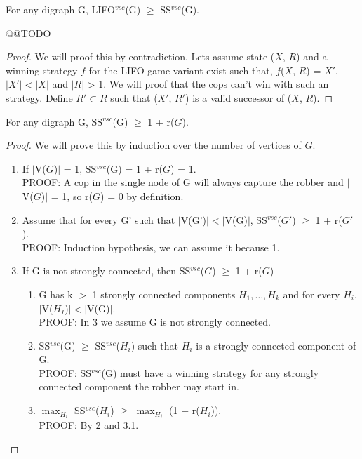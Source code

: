 \begin{lemma}
For any digraph G, LIFO$^{vsc}$(G) $\geq$ SS$^{vsc}$(G).
\end{lemma}
@@TODO
\begin{proof}
We will proof this by contradiction. Lets assume state ($X$, $R$) and a winning strategy $f$ for the LIFO game variant exist such that, $f$($X$, $R$) = $X'$, $|X'| < |X|$ and $|R|$ > 1. We will proof that the cops can't win with such an strategy. Define $R' \subset R$ such that ($X'$, $R'$) is a valid successor of ($X$, $R$).
\end{proof}
\begin{lemma}
For any digraph G, SS$^{vsc}$(G) $\geq$ 1 + r($G$).
\end{lemma}
\begin{proof}
We will prove this by induction over the number of vertices of $G$.
\begin{enumerate}
  \item If $|$V($G$)$|$ = 1, SS$^{vsc}$(G) = 1 + r($G$) = 1. \\
  PROOF: A cop in the single node of G will always capture the robber and $|$V($G$)$|$ = 1, so r($G$) = 0 by definition.
  \item Assume that for every G' such that  $|$V(G')$| < |$V(G)$|$, SS$^{vsc}$($G'$) $\geq$ 1 + r($G'$). \\
  PROOF: Induction hypothesis, we can assume it because 1.
  \item If G is not strongly connected, then SS$^{vsc}$($G$) $\geq$ 1 + r($G$)
  \begin{enumerate}[label*=\arabic*.]
    \item G has k $>$ 1 strongly connected components $H_1, \ldots, H_k$ and for every $H_i$, $|$V($H_I$)$| < |$V(G)$|$. \\
    PROOF: In 3 we assume G is not strongly connected.
    
    \item SS$^{vsc}$(G) $\geq$ SS$^{vsc}$($H_i$) such that $H_i$ is a strongly connected component of G. \\
    PROOF: SS$^{vsc}$(G) must have a winning strategy for any strongly connected component the robber may start in.
    
    \item $\max_{H_i}$ SS$^{vsc}$($H_i$) $\geq$  $\max_{H_i}$ (1 + r($H_i$)). \\
    PROOF: By 2 and 3.1.
    

\end{enumerate}
\end{enumerate}
\end{proof}
